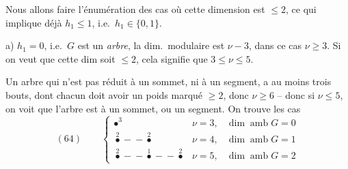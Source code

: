 \documentclass[11pt,a4paper]{article}
\begin{document}
Nous allons faire l'énumération des cas où cette dimension est $\leqslant 2$, ce qui implique déjà $h_1 \leqslant 1$, i.e.\ $h_1 \in \{0, 1\}$.


a) $h_1 = 0$, i.e.\ $G$ est un \emph{arbre}, la dim.\ modulaire est $\nu - 3$, dans ce cas $\nu \geqslant 3$. Si on veut que cette dim soit $\leqslant 2$, cela signifie que $3 \leqslant \nu \leqslant 5$.

Un arbre qui n'est pas réduit à un \struck{\ill{}} sommet, ni à un segment, a au moins trois bouts, dont chacun doit avoir un poids marqué $\geqslant 2$, donc $\nu \geqslant 6$ -- donc si $\nu \leqslant 5$, on voit que l'arbre est  à un sommet, ou un segment. On trouve les cas
\[
(64)\qquad
\left\{
\begin{array}{lll}
\bullet^{3} & \nu = 3, & \dim \operatorname{amb} G = 0 \\[4pt]
\overset{2}{\bullet}\!\!-\!\!\!-\!\!\overset{2}{\bullet} & \nu = 4, & \dim \operatorname{amb} G = 1 \\[4pt]
\overset{2}{\bullet}\!\!-\!\!\!-\!\!\overset{1}{\bullet}\!\!-\!\!\!-\!\!\overset{2}{\bullet} & \nu = 5, & \dim \operatorname{amb} G = 2
\end{array}
\right.
\]
\end{document}
